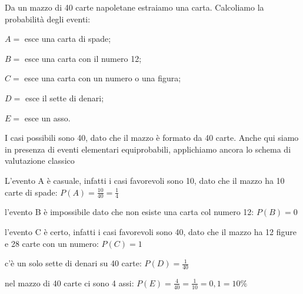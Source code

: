 \begin{esempio}
Da un mazzo di 40 carte napoletane estraiamo una carta. Calcoliamo la 
probabilità degli eventi:
\begin{itemize*}
\item $A=$ esce una carta di spade;
\item $B=$ esce una carta con il numero 12;
\item $C=$ esce una carta con un numero o una figura;
\item $D=$ esce il sette di denari;
\item $E=$ esce un asso.
\end{itemize*}
I casi possibili sono 40, dato che il mazzo è formato da 40 carte. Anche qui 
siamo in presenza di eventi elementari equiprobabili, applichiamo ancora lo 
schema di valutazione classico
\begin{itemize*}
\item L'evento A è casuale, infatti i casi favorevoli sono 10, dato che il 
mazzo 
ha 10 carte di spade: $P(A)=\frac{10}{40}=\frac 1 4$
\item l'evento B è impossibile dato che non esiste una carta col numero 12: $ 
P(B)=0 $
\item l'evento C è certo, infatti i casi favorevoli sono 40, dato che il 
mazzo 
ha 12 figure e 28 carte con un numero: $P(C)=1$
\item c'è un solo sette di denari su 40 carte: $P(D)=\frac 1{40}$
\item nel mazzo di 40 carte ci sono 4 assi: $P(E)=\frac 4{40}=\frac 
1{10}=0,1=10\%$
\end{itemize*}
\end{esempio}

